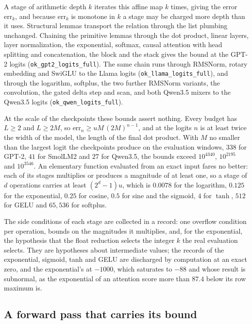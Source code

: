 \documentclass[11pt]{article}
\theoremstyle{plain}
\theoremstyle{definition}
\newcommand{\code}[1]{\texttt{#1}}
\begin{document}
A stage of arithmetic depth $k$ iterates this affine map $k$ times, giving the
error $\mathrm{err}_k$, and because $\mathrm{err}_k$ is monotone in $k$ a stage
may be charged more depth than it uses. Structural lemmas transport the
relation through the list plumbing unchanged. Chaining the primitive lemmas
through the dot product, linear layers, layer normalization, the exponential,
softmax, causal attention with head splitting and concatenation, the block and
the stack gives the bound at the GPT-2 logits (\code{ok\_gpt2\_logits\_full}).
The same chain runs through RMSNorm, rotary embedding and SwiGLU to the Llama
logits (\code{ok\_llama\_logits\_full}), and through the logarithm, softplus,
the two further RMSNorm variants, the convolution, the gated delta step and
scan, and both Qwen3.5 mixers to the Qwen3.5 logits
(\code{ok\_qwen\_logits\_full}).

At the scale of the checkpoints these bounds assert nothing. Every budget has
$L \ge 2$ and $L \ge 2M$, so
$\mathrm{err}_n \ge uM\,(2M)^{n-1}$, and at the logits $n$ is at least twice the
width of the model, the length of the final dot product. With $M$ no smaller
than the largest logit the checkpoints produce on the evaluation windows, $338$
for GPT-2, $41$ for SmolLM2 and $27$ for Qwen3.5, the bounds exceed
$10^{4340}$, $10^{2195}$ and $10^{3546}$. An elementary function evaluated from
an exact input fares no better: each of its stages multiplies or produces a
magnitude of at least one, so a stage of $d$ operations carries at least
$(2^d - 1)u$, which is $0.0078$ for the logarithm, $0.125$ for the
exponential, $0.25$ for cosine, $0.5$ for sine and the sigmoid, $4$ for
$\tanh$, $512$ for GELU and $65{,}536$ for softplus.

The side conditions of each stage are collected in a record: one overflow
condition per operation, bounds on the magnitudes it multiplies, and, for the
exponential, the hypothesis that the float reduction selects the integer $k$
the real evaluation selects. They are hypotheses about intermediate values; the
records of the exponential, sigmoid, tanh and GELU are discharged by
computation at an exact zero, and the exponential's at $-1000$, which saturates
to $-88$ and whose result is subnormal, as the exponential of an attention
score more than $87.4$ below its row maximum is.

\subsection{A forward pass that carries its bound}
\label{sec:runerr}
\end{document}
